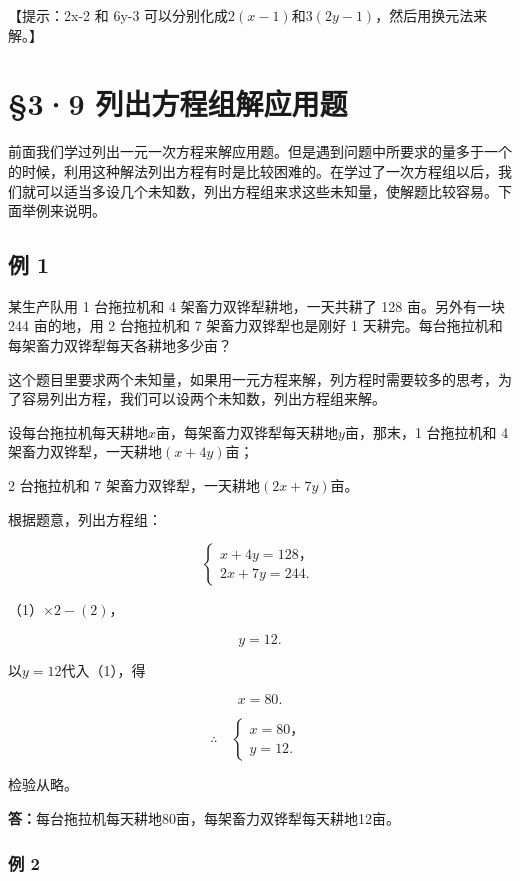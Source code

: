 【提示：2x-2 和 6y-3
可以分别化成\(2(x-1)\)和\(3(2y-1)\)，然后用换元法来解。】

\section{§3·9 列出方程组解应用题}

前面我们学过列出一元一次方程来解应用题。但是遇到问题中所要求的量多于一个的时候，利用这种解法列出方程有时是比较困难的。在学过了一次方程组以后，我们就可以适当多设几个未知数，列出方程组来求这些未知量，使解题比较容易。下面举例来说明。

\subsection{例 1}

某生产队用 1 台拖拉机和 4 架畜力双铧犁耕地，一天共耕了 128
亩。另外有一块 244 亩的地，用 2 台拖拉机和 7 架畜力双铧犁也是刚好 1
天耕完。每台拖拉机和每架畜力双铧犁每天各耕地多少亩？

这个题目里要求两个未知量，如果用一元方程来解，列方程时需要较多的思考，为了容易列出方程，我们可以设两个未知数，列出方程组来解。

设每台拖拉机每天耕地\(x\)亩，每架畜力双铧犁每天耕地\(y\)亩，那末，1
台拖拉机和 4 架畜力双铧犁，一天耕地\((x+4y)\)亩；

2 台拖拉机和 7 架畜力双铧犁，一天耕地\((2x+7y)\)亩。

根据题意，列出方程组：

\[
\left\{ \begin{array}{l} x + 4 y = 128\text{，} \\ 2 x + 7 y = 244. \end{array} \right. \tag{1}
\]

（1）\(\times 2 - (2)\)，

\[
y = 12.
\]

以\(y = 12\)代入（1），得

\[
x = 80.
\]

\[
\therefore \quad \left\{ \begin{array}{l} x = 80\text{，} \\ y = 12. \end{array} \right.
\]

检验从略。

\textbf{答：}每台拖拉机每天耕地80亩，每架畜力双铧犁每天耕地12亩。

\subsubsection{例 2}

